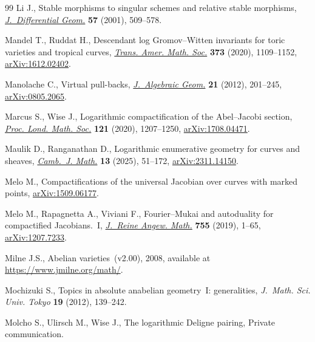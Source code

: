 \documentclass[11pt]{article}
\numberwithin{equation}{section}
\numberwithin{equation}{section}
\theoremstyle{definition}
\begin{document}
\begin{thebibliography}{99}
Li J., Stable morphisms to singular schemes and relative stable morphisms,
 \href{https://doi.org/10.4310/jdg/1090348132}{\textit{J.~Differential Geom.}}
 \textbf{57} (2001), 509--578.

Mandel T., Ruddat H., Descendant log {G}romov--{W}itten invariants for toric
 varieties and tropical curves,
 \href{https://doi.org/10.1090/tran/7936}{\textit{Trans. Amer. Math. Soc.}}
 \textbf{373} (2020), 1109--1152,
 \href{http://arxiv.org/abs/1612.02402}{arXiv:1612.02402}.

Manolache C., Virtual pull-backs,
 \href{https://doi.org/10.1090/S1056-3911-2011-00606-1}{\textit{J.~Algebraic
 Geom.}} \textbf{21} (2012), 201--245,
 \href{http://arxiv.org/abs/0805.2065}{arXiv:0805.2065}.

Marcus S., Wise J., Logarithmic compactification of the {A}bel--{J}acobi
 section, \href{https://doi.org/10.1112/plms.12365}{\textit{Proc. Lond. Math.
 Soc.}} \textbf{121} (2020), 1207--1250,
 \href{http://arxiv.org/abs/1708.04471}{arXiv:1708.04471}.

Maulik D., Ranganathan D., Logarithmic enumerative geometry for curves and
 sheaves, \href{https://doi.org/10.4310/cjm.250319031722}{\textit{Camb.~J.
 Math.}} \textbf{13} (2025), 51--172,
 \href{http://arxiv.org/abs/2311.14150}{arXiv:2311.14150}.

Melo M., Compactifications of the universal {J}acobian over curves with marked
 points, \href{http://arxiv.org/abs/1509.06177}{arXiv:1509.06177}.

Melo M., Rapagnetta A., Viviani F., Fourier--{M}ukai and autoduality for
 compactified {J}acobians.~{I},
 \href{https://doi.org/10.1515/crelle-2017-0009}{\textit{J.~Reine Angew.
 Math.}} \textbf{755} (2019), 1--65,
 \href{http://arxiv.org/abs/1207.7233}{arXiv:1207.7233}.

Milne J.S., Abelian varieties~(v2.00), 2008, {a}vailable at
 \url{https://www.jmilne.org/math/}.

Mochizuki S., Topics in absolute anabelian geometry~{I}: generalities,
 \textit{J.~Math. Sci. Univ. Tokyo} \textbf{19} (2012), 139--242.

Molcho S., Ulirsch M., Wise J., The logarithmic {D}eligne pairing, {P}rivate
 communication.


\end{thebibliography}
\end{document}
